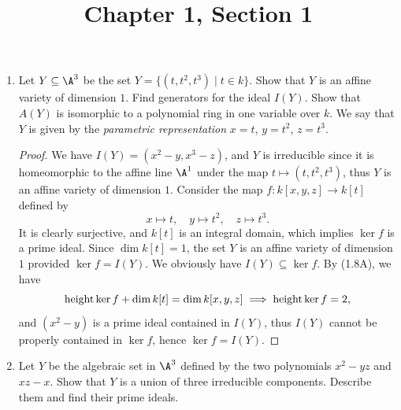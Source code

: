 \documentclass[a4paper]{article}
\title{Chapter 1, Section 1}
\begin{document}
\maketitle

\begin{enumerate} [label=\textbf{\arabic*.}, leftmargin=0em]

    \item[\textbf{2.}] Let $Y \subseteq \A^3$ be the set $Y = \{(t, t^2, t^3) \mid t \in k \}$. Show that $Y$ is an affine variety of dimension $1$. Find generators for the ideal $I(Y)$. Show that $A(Y)$ is isomorphic to a polynomial ring in one variable over $k$. We say that $Y$ is given by the \textit{parametric representation} $x = t$, $y = t^2$, $z = t^3$.

          \begin{proof}
              We have $I(Y) = (x^2 - y, x^3 - z)$, and $Y$ is irreducible since it is homeomorphic to the affine line $\A^1$ under the map $t \mapsto (t, t^2, t^3)$, thus $Y$ is an affine variety of dimension $1$. Consider the map $f : k[x, y, z] \to k[t]$ defined by
              \begin{equation*}
                  x \mapsto t, \quad y \mapsto t^2, \quad z \mapsto t^3.
              \end{equation*}
              It is clearly surjective, and $k[t]$ is an integral domain, which implies $\ker{f}$ is a prime ideal. Since $\dim{k[t]} = 1$, the set $Y$ is an affine variety of dimension $1$ provided $\ker{f} = I(Y)$. We obviously have $I(Y) \subseteq \ker{f}$. By (1.8A), we have
              \begin{equation*}
                  \operatorname{height}{\ker{f}} + \dim{k[t]} = \dim{k[x, y, z]} \implies \operatorname{height}{\ker{f}} = 2,
              \end{equation*}
              and $(x^2 - y)$ is a prime ideal contained in $I(Y)$, thus $I(Y)$ cannot be properly contained in $\ker{f}$, hence $\ker{f} = I(Y)$.
          \end{proof}

    \item[\textbf{3.}] Let $Y$ be the algebraic set in $\A^3$ defined by the two polynomials $x^2 - yz$ and $xz - x$. Show that $Y$ is a union of three irreducible components. Describe them and find their prime ideals.


\end{enumerate}
\end{document}
